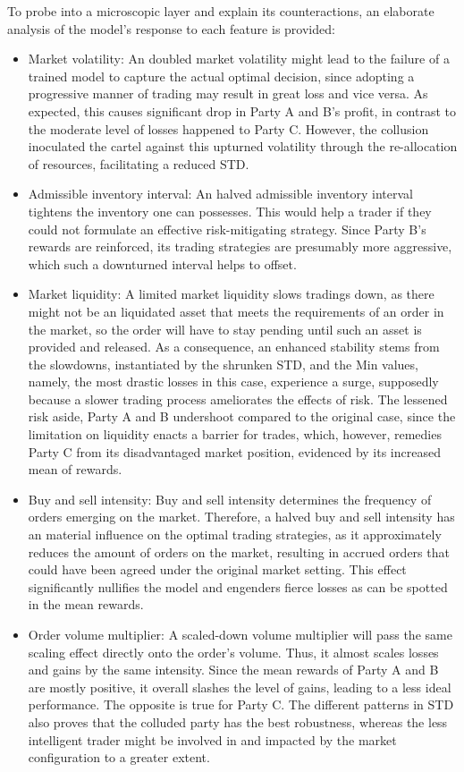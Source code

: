 \documentclass[11pt,twoside]{article}
\numberwithin{Theorem}{section}
\numberwithin{Definition}{section}
\numberwithin{Lemma}{section}
\numberwithin{Algorithm}{section}
\numberwithin{equation}{section}
\begin{document}
To probe into a microscopic layer and explain its counteractions, an elaborate analysis of the model's response to each feature is provided:
\begin{itemize}
    \item Market volatility: An doubled market volatility might lead to the failure of a trained model to capture the actual optimal decision, since adopting a progressive manner of trading may result in great loss and vice versa. As expected, this causes significant drop in Party A and B's profit, in contrast to the moderate level of losses happened to Party C. However, the collusion inoculated the cartel against this upturned volatility through the re-allocation of resources, facilitating a reduced STD.
    \item Admissible inventory interval: An halved admissible inventory interval tightens the inventory one can possesses. This would help a trader if they could not formulate an effective risk-mitigating strategy. Since Party B's rewards are reinforced, its trading strategies are presumably more aggressive, which such a downturned interval helps to offset. 
    \item Market liquidity: A limited market liquidity slows tradings down, as there might not be an liquidated asset that meets the requirements of an order in the market, so the order will have to stay pending until such an asset is provided and released. As a consequence, an enhanced stability stems from the slowdowns, instantiated by the shrunken STD, and the Min values, namely, the most drastic losses in this case, experience a surge, supposedly because a slower trading process ameliorates the effects of risk. The lessened risk aside, Party A and B undershoot compared to the original case, since the limitation on liquidity enacts a barrier for trades, which, however, remedies Party C from its disadvantaged market position, evidenced by its increased mean of rewards.
    \item Buy and sell intensity: Buy and sell intensity determines the frequency of orders emerging on the market. Therefore, a halved buy and sell intensity has an material influence on the optimal trading strategies, as it approximately reduces the amount of orders on the market, resulting in accrued orders that could have been agreed under the original market setting. This effect significantly nullifies the model and engenders fierce losses as can be spotted in the mean rewards.
    \item Order volume multiplier: A scaled-down volume multiplier will pass the same scaling effect directly onto the order's volume. Thus, it almost scales losses and gains by the same intensity. Since the mean rewards of Party A and B are mostly positive, it overall slashes the level of gains, leading to a less ideal performance. The opposite is true for Party C. The different patterns in STD also proves that the colluded party has the best robustness, whereas the less intelligent trader might be involved in and impacted by the market configuration to a greater extent.

\end{itemize}
\end{document}
